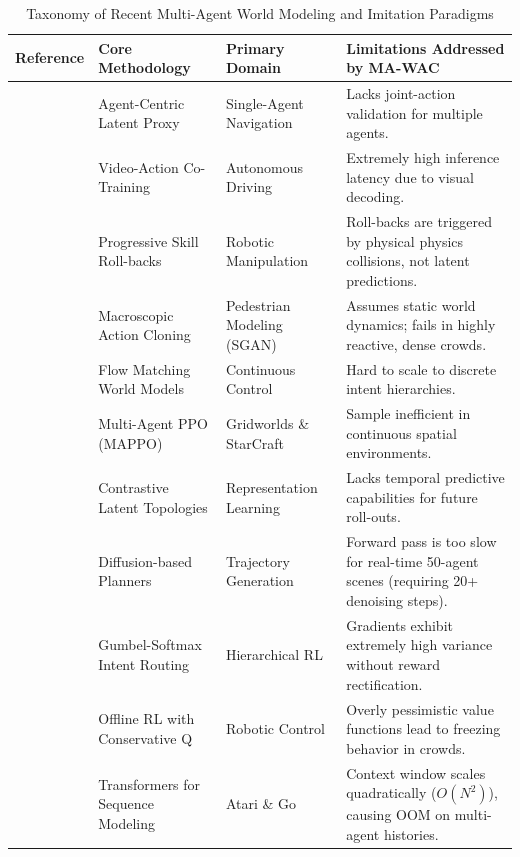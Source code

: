 \documentclass[conference]{IEEEtran}
\begin{document}
\begin{table}[t]
\centering
\caption{Taxonomy of Recent Multi-Agent World Modeling and Imitation Paradigms}
\label{tab:taxonomy}
\begin{tabular}{@{}p{3cm} p{4cm} p{4cm} p{5cm}@{}}
\toprule
\textbf{Reference} & \textbf{Core Methodology} & \textbf{Primary Domain} & \textbf{Limitations Addressed by MA-WAC} \\
\midrule
\cite{quovadis} & Agent-Centric Latent Proxy & Single-Agent Navigation & Lacks joint-action validation for multiple agents. \\
\cite{simwam} & Video-Action Co-Training & Autonomous Driving & Extremely high inference latency due to visual decoding. \\
\cite{skillalpha} & Progressive Skill Roll-backs & Robotic Manipulation & Roll-backs are triggered by physical physics collisions, not latent predictions. \\
\cite{cmac} & Macroscopic Action Cloning & Pedestrian Modeling (SGAN) & Assumes static world dynamics; fails in highly reactive, dense crowds. \\
\cite{ref_0, ref_1, ref_2} & Flow Matching World Models & Continuous Control & Hard to scale to discrete intent hierarchies. \\
\cite{ref_3, ref_4, ref_5} & Multi-Agent PPO (MAPPO) & Gridworlds \& StarCraft & Sample inefficient in continuous spatial environments. \\
\cite{ref_6, ref_7, ref_8} & Contrastive Latent Topologies & Representation Learning & Lacks temporal predictive capabilities for future roll-outs. \\
\cite{ref_9, ref_10, ref_11} & Diffusion-based Planners & Trajectory Generation & Forward pass is too slow for real-time 50-agent scenes (requiring 20+ denoising steps). \\
\cite{ref_12, ref_13, ref_14} & Gumbel-Softmax Intent Routing & Hierarchical RL & Gradients exhibit extremely high variance without reward rectification. \\
\cite{ref_15, ref_16, ref_17} & Offline RL with Conservative Q & Robotic Control & Overly pessimistic value functions lead to freezing behavior in crowds. \\
\cite{ref_18, ref_19, ref_20} & Transformers for Sequence Modeling & Atari \& Go & Context window scales quadratically ($O(N^2)$), causing OOM on multi-agent histories. \\
\bottomrule
\end{tabular}
\end{table}
\end{document}
